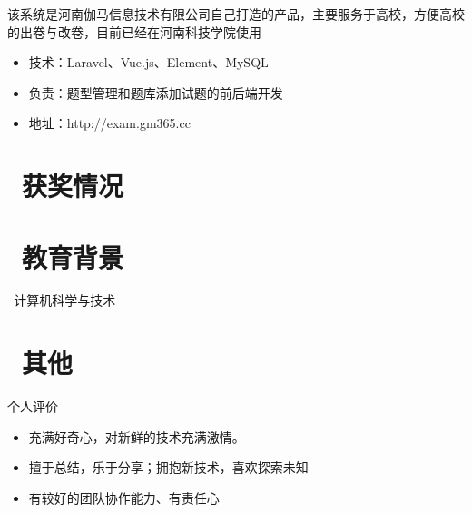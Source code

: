 \documentclass{resume}
\begin{document}
该系统是河南伽马信息技术有限公司自己打造的产品，主要服务于高校，方便高校的出卷与改卷，目前已经在河南科技学院使用
\begin{itemize}
  \item 技术：Laravel、Vue.js、Element、MySQL
  \item 负责：题型管理和题库添加试题的前后端开发
  \item 地址：http://exam.gm365.cc
\end{itemize}

\section{\faHeartO\ 获奖情况}

\section{\faGraduationCap\  教育背景}
\textit\ 计算机科学与技术
\section{\faInfo\ 其他}
个人评价
\begin{itemize}[parsep=0.5ex]
  \item 充满好奇心，对新鲜的技术充满激情。
  \item 擅于总结，乐于分享；拥抱新技术，喜欢探索未知
  \item 有较好的团队协作能力、有责任心
\end{itemize}
\end{document}
